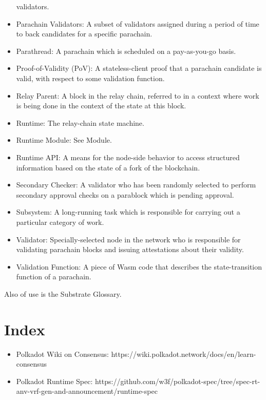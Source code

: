 \begin{itemize}
    validators.
    \item Parachain Validators: A subset of validators assigned during a period
    of time to back candidates for a specific parachain.
    \item Parathread: A parachain which is scheduled on a pay-as-you-go basis.
    \item Proof-of-Validity (PoV): A stateless-client proof that a parachain
    candidate is valid, with respect to some validation function.
    \item Relay Parent: A block in the relay chain, referred to in a context
    where work is being done in the context of the state at this block.
    \item Runtime: The relay-chain state machine.
    \item Runtime Module: See Module.
    \item Runtime API: A means for the node-side behavior to access structured
    information based on the state of a fork of the blockchain.
    \item Secondary Checker: A validator who has been randomly selected to
    perform secondary approval checks on a parablock which is pending approval.
    \item Subsystem: A long-running task which is responsible for carrying out a
    particular category of work.
    \item Validator: Specially-selected node in the network who is responsible
    for validating parachain blocks and issuing attestations about their
    validity.
    \item Validation Function: A piece of Wasm code that describes the
    state-transition function of a parachain.
\end{itemize}

Also of use is the Substrate Glossary.

\section{Index}

\begin{itemize}
    \item Polkadot Wiki on Consensus:
    https://wiki.polkadot.network/docs/en/learn-consensus
    \item Polkadot Runtime Spec:
    https://github.com/w3f/polkadot-spec/tree/spec-rt-anv-vrf-gen-and-announcement/runtime-spec
\end{itemize}

